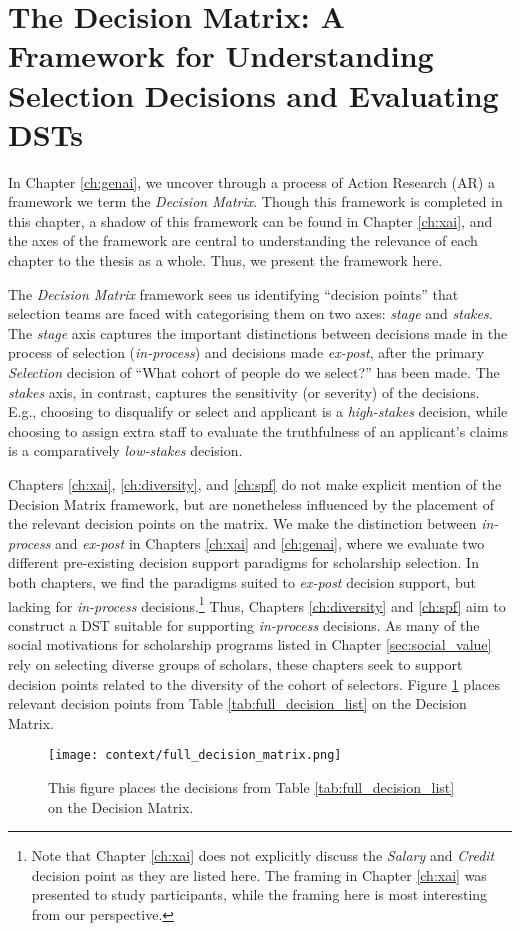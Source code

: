 \section{The Decision Matrix: A Framework for Understanding Selection Decisions and Evaluating DSTs}

In Chapter \ref{ch:genai}, we uncover through a process of Action Research (AR) a framework we term the \emph{Decision Matrix}. Though this framework is completed in this chapter, a shadow of this framework can be found in Chapter \ref{ch:xai}, and the axes of the framework are central to understanding the relevance of each chapter to the thesis as a whole. Thus, we present the framework here.

The \emph{Decision Matrix} framework sees us identifying ``decision points'' that selection teams are faced with categorising them on two axes: \emph{stage} and \emph{stakes}. The \emph{stage} axis captures the important distinctions between decisions made in the process of selection (\emph{in-process}) and decisions made \emph{ex-post}, after the primary \emph{Selection} decision of ``What cohort of people do we select?'' has been made. The \emph{stakes} axis, in contrast, captures the sensitivity (or severity) of the decisions. E.g., choosing to disqualify or select and applicant is a \emph{high-stakes} decision, while choosing to assign extra staff to evaluate the truthfulness of an applicant's claims is a comparatively \emph{low-stakes} decision.

Chapters \ref{ch:xai}, \ref{ch:diversity}, and \ref{ch:spf} do not make explicit mention of the Decision Matrix framework, but are nonetheless influenced by the placement of the relevant decision points on the matrix. We make the distinction between \emph{in-process} and \emph{ex-post} in Chapters \ref{ch:xai} and \ref{ch:genai}, where we evaluate two different pre-existing decision support paradigms for scholarship selection. In both chapters, we find the paradigms suited to \emph{ex-post} decision support, but lacking for \emph{in-process} decisions.\footnote{Note that Chapter \ref{ch:xai} does not explicitly discuss the \emph{Salary} and \emph{Credit} decision point as they are listed here. The framing in Chapter \ref{ch:xai} was presented to study participants, while the framing here is most interesting from our perspective.} Thus, Chapters \ref{ch:diversity} and \ref{ch:spf} aim to construct a DST suitable for supporting \emph{in-process} decisions. As many of the social motivations for scholarship programs listed in Chapter \ref{sec:social_value} rely on selecting diverse groups of scholars, these chapters seek to support decision points related to the diversity of the cohort of selectors. Figure \ref{fig:full_decision_matrix} places relevant decision points from Table \ref{tab:full_decision_list} on the Decision Matrix.

\begin{figure}[htbp]
  \centering
  \texttt{[image: context/full\_decision\_matrix.png]}
  \caption{This figure places the decisions from Table \ref{tab:full_decision_list} on the Decision Matrix.}
  \label{fig:full_decision_matrix}
\end{figure}